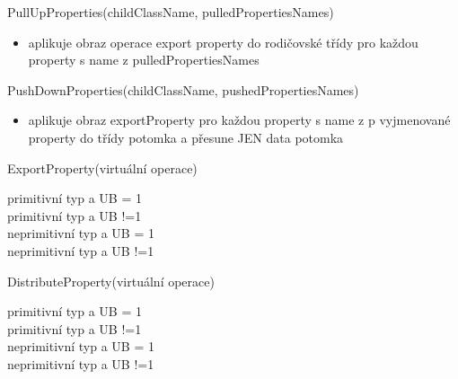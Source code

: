 \documentclass[11pt,twoside,a4paper]{book}
\begin{document}
\begin{list}{Operace :}{}
\item PullUpProperties(childClassName, pulledPropertiesNames)
 \begin{itemize}
   \item aplikuje obraz operace export property do rodičovské třídy pro každou
   property s name z pulledPropertiesNames
 \end{itemize}

\item PushDownProperties(childClassName, pushedPropertiesNames)
\begin{itemize}
  \item aplikuje obraz exportProperty pro každou property s name z p vyjmenované
  property do třídy potomka a přesune JEN data potomka
\end{itemize}

\item ExportProperty(virtuální operace) 
\begin{description}
	\item[primitivní typ a UB = 1] 
	\item[primitivní typ a UB !=1]
	\item[neprimitivní typ a UB = 1]
	\item[neprimitivní typ a UB !=1]
\end{description}

\item DistributeProperty(virtuální operace) 
\begin{description}
	\item[primitivní typ a UB = 1]
	\item[primitivní typ a UB !=1]
	\item[neprimitivní typ a UB = 1]
	\item[neprimitivní typ a UB !=1]
\end{description}


\end{list}
\end{document}
